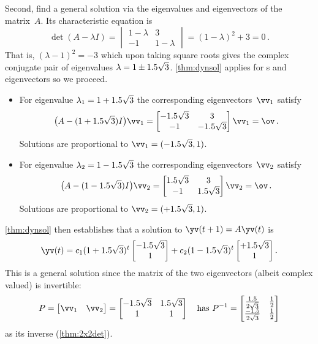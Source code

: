 \begin{example}
\begin{solution}
Second, find a general solution via the eigenvalues and eigenvectors of the matrix~\(A\).  
Its characteristic equation is 
\begin{equation*}
\det(A-\lambda I)=\begin{vmatrix} 1-\lambda&3\\-1&1-\lambda \end{vmatrix}
=(1-\lambda)^2+3=0\,.
\end{equation*}
That is, \((\lambda-1)^2=-3\) which upon taking square roots gives the complex conjugate pair of eigenvalues \(\lambda=1\pm 1.5\sqrt3\).
\autoref{thm:dynsol} applies for s and eigenvectors so we proceed.
\begin{itemize}
\item For eigenvalue \(\lambda_1=1+1.5\sqrt3\) the corresponding eigenvectors~\(\vv_1\) satisfy
\begin{equation*}
\big(A-(1+\i\sqrt3)I\big)\vv_1=\begin{bmatrix} -\i\sqrt3&3\\-1&-\i\sqrt3 \end{bmatrix}\vv_1=\ov\,.
\end{equation*}
Solutions are proportional to \(\vv_1=(-\i\sqrt3,1)\).

\item For eigenvalue \(\lambda_2=1-1.5\sqrt3\) the corresponding eigenvectors~\(\vv_2\) satisfy
\begin{equation*}
\big(A-(1-\i\sqrt3)I\big)\vv_2=\begin{bmatrix} \i\sqrt3&3\\-1&\i\sqrt3 \end{bmatrix}\vv_2=\ov\,.
\end{equation*}
Solutions are proportional to \(\vv_2=(+\i\sqrt3,1)\).
\end{itemize}
\autoref{thm:dynsol} then establishes that a solution to \(\yv(t+1)=A\yv(t)\) is
\begin{equation*}
\yv(t)=c_1(1+\i\sqrt3)^t\begin{bmatrix} -\i\sqrt3\\1 \end{bmatrix}
+c_2(1-\i\sqrt3)^t\begin{bmatrix} +\i\sqrt3\\1 \end{bmatrix}.
\end{equation*}
This is a general solution since the matrix of the two eigenvectors (albeit complex valued) is invertible:
\begin{equation*}
P=\begin{bmatrix} \vv_1&\vv_2 \end{bmatrix}
=\begin{bmatrix} -\i\sqrt3&\i\sqrt3\\1&1 \end{bmatrix}
\quad\text{has }
P^{-1}=\begin{bmatrix} \frac \i{2\sqrt3}&\frac12\\\frac{-\i}{2\sqrt3}&\frac12 \end{bmatrix}
\end{equation*}
as its inverse (\autoref{thm:2x2det}).


\end{solution}
\end{example}
